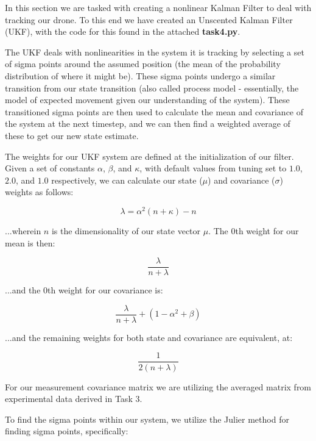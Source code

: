 \documentclass{article}
\begin{document}
In this section we are tasked with creating a nonlinear Kalman Filter to deal with tracking our drone. To this end we have created an Unscented Kalman Filter (UKF), with the code for this found in the attached \textbf{task4.py}.

The UKF deals with nonlinearities in the system it is tracking by selecting a set of sigma points around the assumed position (the mean
of the probability distribution of where it might be). These sigma points undergo a similar transition from our state transition (also called process model - essentially, the model of expected movement given our understanding of the system). These transitioned sigma points are then used to calculate the mean and covariance of the system at the next timestep, and we can then find a weighted average of these to get our new state estimate.

The weights for our UKF system are defined at the initialization of our filter. Given a set of constants $\alpha$, $\beta$, and $\kappa$, with default values from tuning set to $1.0$, $2.0$, and $1.0$ respectively, we can calculate our state ($\mu$) and covariance ($\sigma$) weights as follows:

\begin{equation}
    \lambda = \alpha^2 (n + \kappa) - n
\end{equation}

\noindent...wherein $n$ is the dimensionality of our state vector $\mu$. The 0th weight for our mean is then:

\begin{equation}
    \frac{\lambda}{n + \lambda}
\end{equation}

\noindent...and the 0th weight for our covariance is:

\begin{equation}
    \frac{\lambda}{n + \lambda} + (1 - \alpha^2 + \beta)
\end{equation}

\noindent...and the remaining weights for both state and covariance are equivalent, at:

\begin{equation}
    \frac{1}{2(n + \lambda)}
\end{equation}

For our measurement covariance matrix we are utilizing the averaged matrix from experimental data derived in Task 3.

To find the sigma points within our system, we utilize the Julier method for finding sigma points, specifically:
\end{document}
